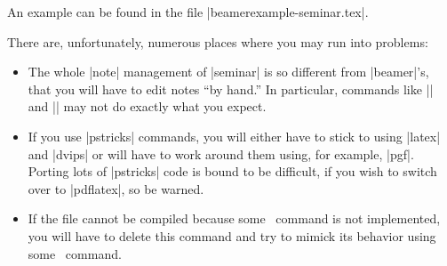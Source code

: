 An example can be found in the file |beamerexample-seminar.tex|.

There are, unfortunately, numerous places where you may run into problems:
\begin{itemize}
\item
  The whole |note| management of |seminar| is so different from |beamer|'s, that you will have to edit notes ``by hand.'' In particular, commands like |\ifslidesonly| and |\ifslide| may not do exactly what you expect.
\item
  If you use |pstricks| commands, you will either have to stick to using |latex| and |dvips| or will have to work around them using, for example, |pgf|. Porting lots of |pstricks| code is bound to be difficult, if you wish to switch over to |pdflatex|, so be warned.
\item
  If the file cannot be compiled because some \seminar\ command is not implemented, you will have to delete this command and try to mimick its behavior using some \beamer\ command.
\end{itemize}

